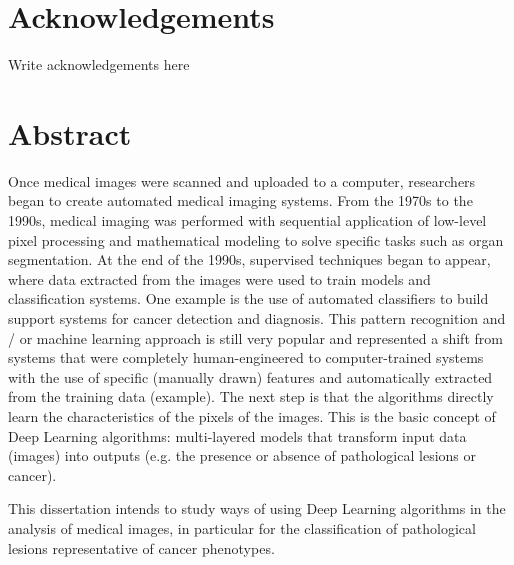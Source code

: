 \documentclass[
  oneside,
  11pt, a4paper,
  footinclude=true,
  headinclude=true,
  cleardoublepage=empty
]{scrbook}
\author{João Pedro Pereira Fontes}
\date{\myear} %
\begin{document}
  \umfrontcover
  \umtitlepage

  \chapter*{Acknowledgements}
    Write acknowledgements here

  \chapter*{Abstract}
    Once medical images were scanned and uploaded to a computer, researchers began to create automated medical imaging systems. From the 1970s to the 1990s, medical imaging was performed with sequential application of low-level pixel processing and mathematical modeling to solve specific tasks such as organ segmentation. At the end of the 1990s, supervised techniques began to appear, where data extracted from the images were used to train models and classification systems. One example is the use of automated classifiers to build support systems for cancer detection and diagnosis. This pattern recognition and / or machine learning approach is still very popular and represented a shift from systems that were completely human-engineered to computer-trained systems with the use of specific (manually drawn) features and automatically extracted from the training data (example). The next step is that the algorithms directly learn the characteristics of the pixels of the images. This is the basic concept of Deep Learning algorithms: multi-layered models that transform input data (images) into outputs (e.g. the presence or absence of pathological lesions or cancer).

    This dissertation intends to study ways of using Deep Learning algorithms in the analysis of medical images, in particular for the classification of pathological lesions representative of cancer phenotypes.

  \cleardoublepage
\end{document}
